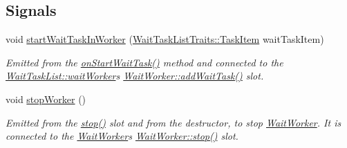 \subsection*{Signals}
\begin{DoxyCompactItemize}
\item 
\hypertarget{class_wait_task_list_a1a0af6e55c2eca825e8c31f0ace72305}{}void \hyperlink{class_wait_task_list_a1a0af6e55c2eca825e8c31f0ace72305}{start\+Wait\+Task\+In\+Worker} (\hyperlink{struct_wait_task_list_traits_1_1_task_item}{Wait\+Task\+List\+Traits\+::\+Task\+Item} wait\+Task\+Item)\label{class_wait_task_list_a1a0af6e55c2eca825e8c31f0ace72305}

\begin{DoxyCompactList}\small\item\em Emitted from the \hyperlink{class_wait_task_list_a802528b32bbcacb201bdd5fcfc4dacf6}{on\+Start\+Wait\+Task()} method and connected to the \hyperlink{class_wait_task_list_a35a7c23d4a05850df13e3f8f565c2ba0}{Wait\+Task\+List\+::wait\+Worker}\textquotesingle{}s \hyperlink{class_wait_worker_adaff9ea88795fa9d902711c1952828cd}{Wait\+Worker\+::add\+Wait\+Task()} slot. \end{DoxyCompactList}\item 
\hypertarget{class_wait_task_list_a2839e0820f114d0d8e3509aa9b9a8688}{}void \hyperlink{class_wait_task_list_a2839e0820f114d0d8e3509aa9b9a8688}{stop\+Worker} ()\label{class_wait_task_list_a2839e0820f114d0d8e3509aa9b9a8688}

\begin{DoxyCompactList}\small\item\em Emitted from the \hyperlink{class_wait_task_list_acffb5d311033d065e2b5889a0c51f3f1}{stop()} slot and from the destructor, to stop \hyperlink{class_wait_worker}{Wait\+Worker}. It is connected to the \hyperlink{class_wait_worker}{Wait\+Worker}\textquotesingle{}s \hyperlink{class_wait_worker_af01864effa7662c8261128ff12fb922d}{Wait\+Worker\+::stop()} slot. \end{DoxyCompactList}\end{DoxyCompactItemize}
